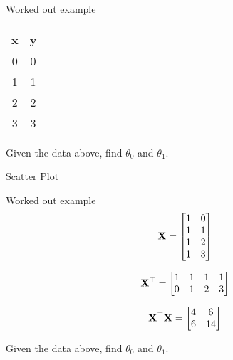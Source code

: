 \documentclass{beamer}
\begin{document}
\begin{frame}{Worked out example}
    \begin{center}
 \begin{tabular}{||c c||} 
 \hline
 x  & y \\ [0.5ex] 
 \hline\hline
 0 & 0 \\
 1 & 1 \\
 2 & 2 \\
 3 & 3 \\
 \hline
\end{tabular}
\end{center}

Given the data above, find $\theta_{0}$ and $\theta_{1}$.

\end{frame}


\begin{frame}{Scatter Plot}
    
\end{frame}


\begin{frame}{Worked out example}
$$\mathbf{X} = \begin{bmatrix}
            1 & 0\\
            1 & 1\\
            1 & 2\\
            1 & 3
        \end{bmatrix}$$
        
$$\mathbf{X}^\top = \begin{bmatrix}
            1&1&1&1\\
            0&1&2&3
        \end{bmatrix}$$
        
$$\mathbf{X}^\top\mathbf{X} = \begin{bmatrix}
            4 &6\\6&14
        \end{bmatrix}$$

Given the data above, find $\theta_{0}$ and $\theta_{1}$.
\end{frame}
\end{document}
